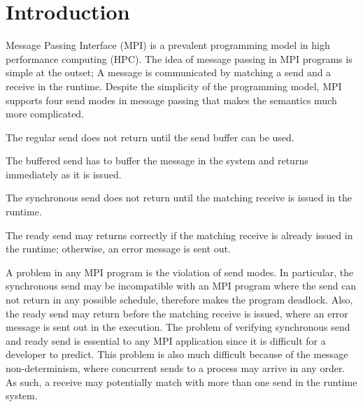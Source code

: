  \section{Introduction}
Message Passing Interface (MPI) is a prevalent programming model in high performance computing (HPC).
The idea of message passing in MPI programs is simple at the outset; A message is communicated by matching a send and a receive in the runtime. Despite the simplicity of the programming model, MPI supports four send modes in message passing that makes the semantics much more complicated.
\begin{compactitem}
\item The regular send does not return until the send buffer can be used. 
\item The buffered send has to buffer the message in the system and returns immediately as it is issued. 
\item The synchronous send does not return until the matching receive is issued in the runtime. 
\item The ready send may returns correctly if the matching receive is already issued in the runtime; otherwise, an error message is sent out.
\end{compactitem}
A problem in any MPI program is the violation of send modes.
In particular, the synchronous send may be incompatible with an MPI program where the send can not return in any possible schedule, therefore makes the program deadlock.  
Also, the ready send may return before the matching receive is issued, where an error message is sent out in the execution. 
The problem of verifying synchronous send and ready send is essential to any MPI application since it is difficult for a developer to predict. This problem is also much difficult because of the message non-determinism, where concurrent sends to a process may arrive in any order. As such, a receive may potentially match with more than one send in the runtime system. 

